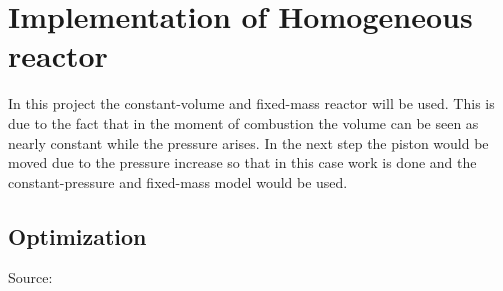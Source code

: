 \documentclass[12pt,oneside,a4paper,english]{article}
\begin{document}
\newpage %

\section{Implementation of Homogeneous reactor}
In this project the constant-volume and fixed-mass reactor will be used. This is due to the fact that in the moment of combustion the volume can be seen as nearly constant while the pressure arises. In the next step the piston would be moved due to the pressure increase so that in this case work is done and the constant-pressure and fixed-mass model would be used. 

\subsection{Optimization} %
Source: \cite{vandersickel2013}
\end{document}
